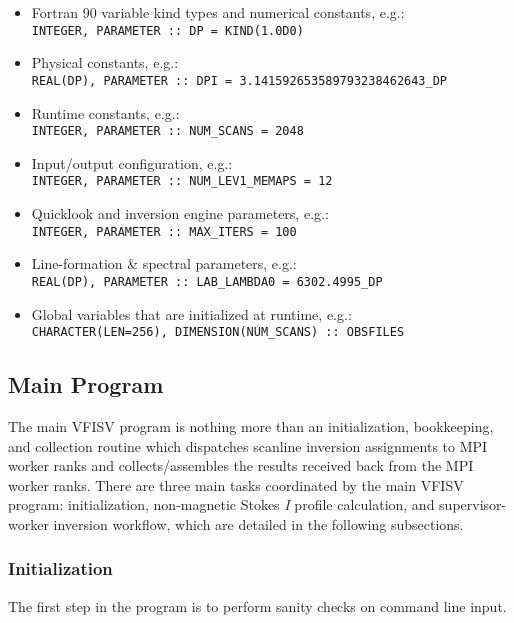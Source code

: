 \documentclass[11pt]{article}
\begin{document}
\begin{itemize}
  \renewcommand\labelitemi{\scriptsize$\blacksquare$}
  \item Fortran 90 variable kind types and numerical constants, e.g.:\\
        \texttt{INTEGER, PARAMETER :: DP = KIND(1.0D0)}
  \item Physical constants, e.g.:\\
        \texttt{REAL(DP), PARAMETER :: DPI = 3.141592653589793238462643\_DP}
  \item Runtime constants, e.g.:\\
        \texttt{INTEGER, PARAMETER :: NUM\_SCANS = 2048}
  \item Input/output configuration, e.g.:\\
        \texttt{INTEGER, PARAMETER :: NUM\_LEV1\_MEMAPS = 12}
  \item Quicklook and inversion engine parameters, e.g.:\\
        \texttt{INTEGER, PARAMETER :: MAX\_ITERS = 100}
  \item Line-formation \& spectral parameters, e.g.:\\
        \texttt{REAL(DP), PARAMETER :: LAB\_LAMBDA0 = 6302.4995\_DP}
  \item Global variables that are initialized at runtime, e.g.:\\
        \texttt{CHARACTER(LEN=256), DIMENSION(NUM\_SCANS) :: OBSFILES}
\end{itemize}

\subsection{Main Program}\label{s:main}
The main VFISV program is nothing more than an initialization, bookkeeping,
and collection routine which dispatches scanline inversion assignments to MPI worker ranks and
collects/assembles the results received back from the MPI worker ranks.  There are 
three main tasks coordinated by the main VFISV program: initialization, non-magnetic Stokes
\textit{I} profile calculation, and supervisor-worker inversion workflow, which are detailed in the following
subsections.

\subsubsection{Initialization}\label{ss:init}

The first step in the program is to perform sanity checks on command line input.\\
\end{document}
